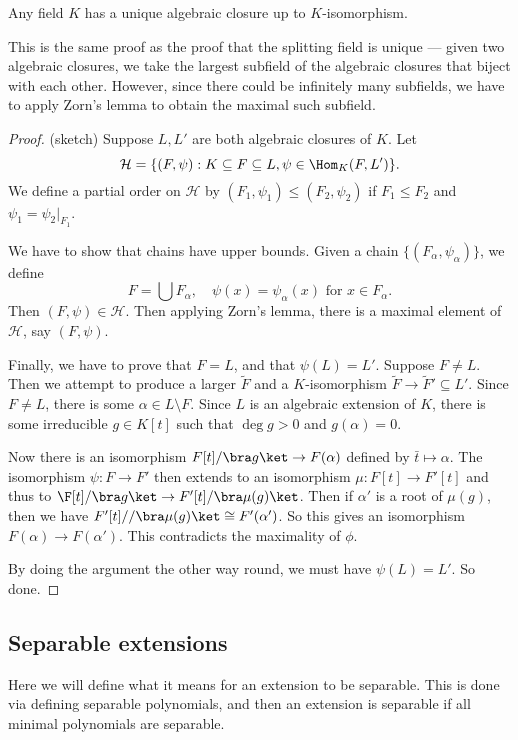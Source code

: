\documentclass[a4paper]{article}
\begin{document}
\begin{thm}
  Any field $K$ has a unique algebraic closure up to $K$-isomorphism.
\end{thm}

This is the same proof as the proof that the splitting field is unique --- given two algebraic closures, we take the largest subfield of the algebraic closures that biject with each other. However, since there could be infinitely many subfields, we have to apply Zorn's lemma to obtain the maximal such subfield.

\begin{proof}(sketch)
  Suppose $L, L'$ are both algebraic closures of $K$. Let
  \[
    \mathcal{H} = \{(F, \psi): K\subseteq F\subseteq L, \psi \in \Hom_K(F, L')\}.
  \]
  We define a partial order on $\mathcal{H}$ by $(F_1, \psi_1) \leq (F_2, \psi_2)$ if $F_1 \leq F_2$ and $\psi_1= \psi_2|_{F_1}$.

  We have to show that chains have upper bounds. Given a chain $\{(F_\alpha, \psi_\alpha)\}$, we define
  \[
    F = \bigcup F_\alpha,\quad \psi(x) = \psi_\alpha(x)\text{ for }x \in F_\alpha.
  \]
  Then $(F, \psi) \in \mathcal{H}$. Then applying Zorn's lemma, there is a maximal element of $\mathcal{H}$, say $(F, \psi)$.

  Finally, we have to prove that $F = L$, and that $\psi(L) = L'$. Suppose $F \not= L$. Then we attempt to produce a larger $\tilde{F}$ and a $K$-isomorphism $\tilde{F} \to \tilde{F}' \subseteq L'$. Since $F \not= L$, there is some $\alpha \in L\setminus F$. Since $L$ is an algebraic extension of $K$, there is some irreducible $g \in K[t]$ such that $\deg g > 0$ and $g(\alpha) = 0$.

  Now there is an isomorphism $F[t]/\bra g\ket \to F(\alpha)$ defined by $\bar{t} \mapsto \alpha$. The isomorphism $\psi: F \to F'$ then extends to an isomorphism $\mu: F[t] \to F'[t]$ and thus to $\F[t]/\bra g\ket \to F'[t]/\bra \mu(g) \ket$. Then if $\alpha'$ is a root of $\mu(g)$, then we have $F'[t]//\bra \mu(g)\ket \cong F'(\alpha')$. So this gives an isomorphism $F(\alpha) \to F(\alpha')$. This contradicts the maximality of $\phi$.

  By doing the argument the other way round, we must have $\psi(L) = L'$. So done.
\end{proof}

\subsection{Separable extensions}
Here we will define what it means for an extension to be separable. This is done via defining separable polynomials, and then an extension is separable if all minimal polynomials are separable.
\end{document}
